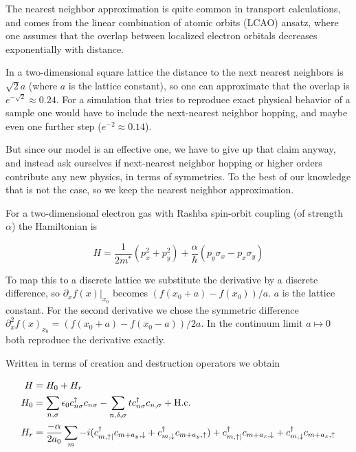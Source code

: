 \documentclass[11pt]{report}
\newcommand{\inp}[1]{\ensuremath{\left(#1\right)}}
\newcommand{\dell}{\partial}
\begin{document}
The nearest neighbor approximation is quite common in transport calculations,
and comes from the linear combination of atomic orbits (LCAO) ansatz, where
one assumes that the overlap between localized electron orbitals decreases
exponentially with distance.

In a two-dimensional square lattice the distance to the next nearest
neighbors is $\sqrt{2} a$ (where $a$ is the lattice constant), so one can
approximate that the overlap is $e^{-\sqrt{2}} \approx 0.24$. For a simulation
that tries to reproduce exact physical behavior of a sample one would have to
include the next-nearest neighbor hopping, and maybe even one further step
($e^{-2} \approx 0.14$).

But since our model is an effective one, we have to give up that claim
anyway, and instead ask ourselves if next-nearest neighbor hopping or higher
orders contribute any new physics, in terms of symmetries. To the best of our
knowledge that is not the case, so we keep the nearest neighbor approximation.

For a two-dimensional electron gas with Rashba spin-orbit coupling (of
strength $\alpha$) the Hamiltonian is

\begin{equation}
    H = \frac{1}{2 m^*} (p_x^2 + p_y^2) +
    \frac{\alpha}{\hbar} \inp{p_y\sigma_x - p_x\sigma_y}
\end{equation}

To map this to a discrete lattice we substitute the derivative by a discrete
difference, so $\dell_x f(x)|_{x_0}$ becomes $(f(x_0+a) - f(x_0))/a$. $a$ is
the lattice constant. For the
second derivative we chose the symmetric difference $\dell_x^2 f(x)_{x_0} =
(f(x_0+a) - f(x_0-a))/2a$. In the continuum limit $a \mapsto 0$ both reproduce
the derivative exactly.

Written in terms of creation and destruction operators we obtain

\begin{align}
    H   &= H_0 + H_r\\
    H_0 &= \sum_{n,\sigma} \epsilon_0 c^{\dagger}_{n\sigma} c_{n\sigma}
           - \sum_{n,\delta,\sigma} t c^\dagger_{n\sigma} c_{n,\sigma} +
           \textnormal{H.c.}\\
    H_r &= \frac{-\alpha}{2 a_0} \sum_m
        -i( c^\dagger_{m,\uparrow|} c_{m+a_y,\downarrow}
            + c^\dagger_{m,\downarrow} c_{m+a_y,\uparrow})
         + c^\dagger_{m,\uparrow|} c_{m+a_x,\downarrow}
            + c^\dagger_{m,\downarrow} c_{m+a_x,\uparrow}
\end{align}
\end{document}
